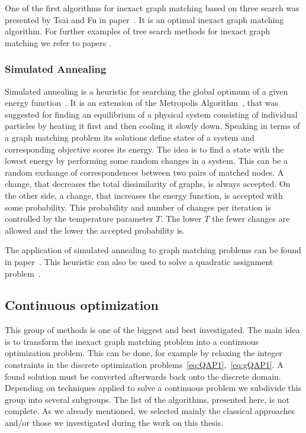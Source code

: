 One of the first algorithms for inexact graph matching based on three search was presented by Tsai and Fu in paper~\cite{Fu1979}. It is an optimal inexact graph matching algorithm. For further examples of tree search methods for inexact graph matching we refer to papers \cite{Bunke1983_inexactGM,Shapiro1981,Wang1995}.
\subsubsection{Simulated Annealing}
Simulated annealing is a heuristic for searching the global optimum of a given energy function~\cite{Burkard98thequadratic}. It is an extension of the Metropolis Algorithm~\cite{Metropolis}, that was suggested for finding an equilibrium of a physical system consisting of individual particles by heating it first and then cooling it slowly down. Speaking in terms of a graph matching problem its solutions define states of a system and corresponding objective scores its energy. The idea is to find a state with the lowest energy by performing some random changes in a system. This can be a random exchange of correspondences between two pairs of matched nodes. A change, that decreases the total dissimilarity of graphs, is always accepted. On the other side, a change, that increases the energy function, is accepted with some probability. This probability and number of changes per iteration is controlled by the temperature parameter $T$. The lower $T$ the fewer changes are allowed and the lower the accepted probability is. 

The application of simulated annealing to graph matching problems can be found in paper~\cite{Herault1990_SimulatedAnnealing}. This heuristic can also be used to solve a quadratic assignment problem~\cite{Burkard98thequadratic}.
\subsection{Continuous optimization}
This group of methods is one of the biggest and best investigated. The main idea is to transform the inexact graph matching problem into a continuous optimization problem. This can be done, for example by relaxing the integer constraints in the discrete optimization problems~\eqref{eq:QAP1},~\eqref{eq:gQAP1}. A found solution must be converted afterwards back onto the discrete domain. Depending on techniques applied to solve a continuous problem we subdivide this group into several subgroups. The list of the algorithms, presented here, is not complete. As we already mentioned, we selected mainly the classical approaches and/or those we investigated during the work on this thesis.

